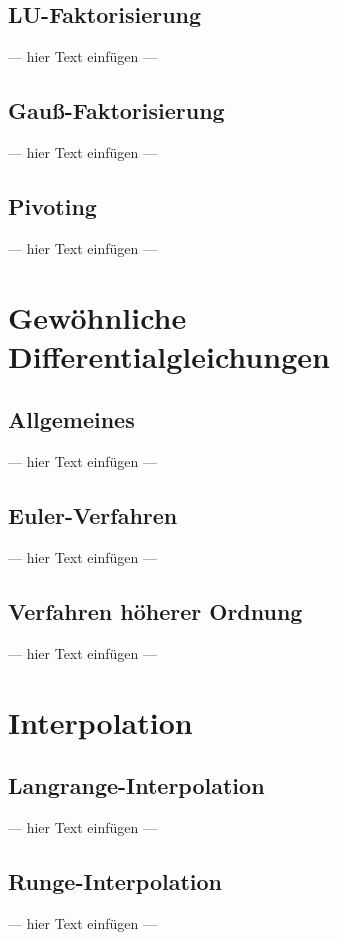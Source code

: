 \documentclass[a4paper, 12pt]{article}
\begin{document}
\subsection{LU-Faktorisierung}
--- hier Text einfügen ---


\subsection{Gauß-Faktorisierung}
--- hier Text einfügen ---


\subsection{Pivoting}
--- hier Text einfügen ---



\section{Gewöhnliche Differentialgleichungen}


\subsection{Allgemeines}
--- hier Text einfügen ---


\subsection{Euler-Verfahren}
--- hier Text einfügen ---


\subsection{Verfahren höherer Ordnung}
--- hier Text einfügen ---



\section{Interpolation}


\subsection{Langrange-Interpolation}
--- hier Text einfügen ---


\subsection{Runge-Interpolation}
--- hier Text einfügen ---
\end{document}
